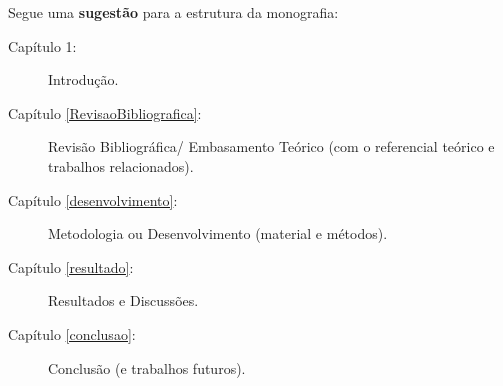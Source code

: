 Segue uma \textbf{sugestão} para a estrutura da monografia: 

\begin{description}
   \item[Capítulo 1:] Introdução.
   \item[Capítulo \ref{RevisaoBibliografica}:] Revisão Bibliográfica/ Embasamento Teórico (com o referencial teórico e trabalhos relacionados).
   \item[Capítulo \ref{desenvolvimento}:] Metodologia ou Desenvolvimento (material e métodos).
   \item[Capítulo \ref{resultado}:] Resultados e Discussões.
   \item[Capítulo \ref{conclusao}:] Conclusão (e trabalhos futuros).
\end{description}


 









